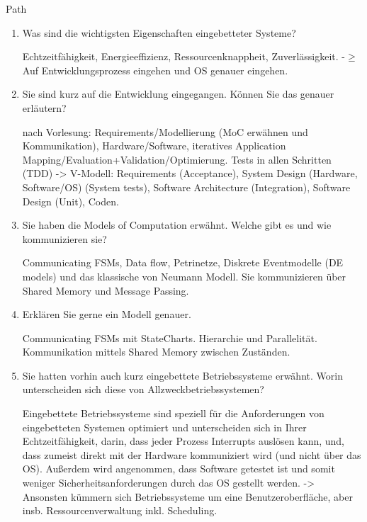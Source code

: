 \documentclass{article}
\author{Leopold Lemmermann}
\begin{document}
\createtitle

\begin{exercise}{Path}
  \begin{enumerate}
    \item Was sind die wichtigsten Eigenschaften eingebetteter Systeme?
          \begin{solution}
            Echtzeitfähigkeit, Energieeffizienz, Ressourcenknappheit, Zuverlässigkeit. -$\geq$ Auf Entwicklungsprozess eingehen und OS genauer eingehen.
          \end{solution}

    \item Sie sind kurz auf die Entwicklung eingegangen. Können Sie das genauer erläutern?
          \begin{solution}
            nach Vorlesung: Requirements/Modellierung (MoC erwähnen und Kommunikation), Hardware/Software, iteratives Application Mapping/Evaluation+Validation/Optimierung.
            Tests in allen Schritten (TDD) -> V-Modell: Requirements (Acceptance), System Design (Hardware, Software/OS) (System tests), Software Architecture (Integration), Software Design (Unit), Coden.
          \end{solution}

    \item Sie haben die Models of Computation erwähnt. Welche gibt es und wie kommunizieren sie?
          \begin{solution}
            Communicating FSMs, Data flow, Petrinetze, Diskrete Eventmodelle (DE models) und das klassische von Neumann Modell. Sie kommunizieren über Shared Memory und Message Passing.
          \end{solution}

    \item Erklären Sie gerne ein Modell genauer.
          \begin{solution}
            Communicating FSMs mit StateCharts. Hierarchie und Parallelität. Kommunikation mittels Shared Memory zwischen Zuständen.
          \end{solution}

    \item Sie hatten vorhin auch kurz eingebettete Betriebssysteme erwähnt. Worin unterscheiden sich diese von Allzweckbetriebssystemen?
          \begin{solution}
            Eingebettete Betriebssysteme sind speziell für die Anforderungen von eingebetteten Systemen optimiert und unterscheiden sich in Ihrer Echtzeitfähigkeit, darin, dass jeder Prozess Interrupts auslösen kann, und, dass zumeist direkt mit der Hardware kommuniziert wird (und nicht über das OS). Außerdem wird angenommen, dass Software getestet ist und somit weniger Sicherheitsanforderungen durch das OS gestellt werden. -> Ansonsten kümmern sich Betriebssysteme um eine Benutzeroberfläche, aber insb. Ressourcenverwaltung inkl. Scheduling.
          \end{solution}


\end{enumerate}
\end{exercise}
\end{document}
